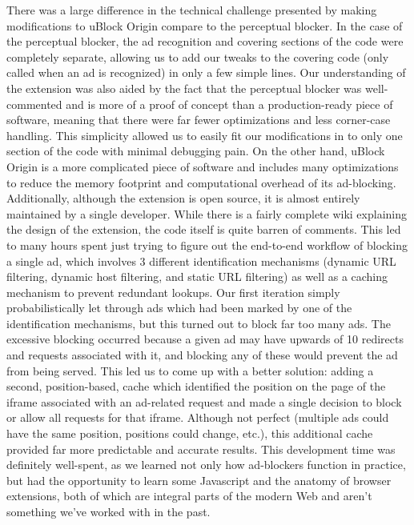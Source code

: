 There was a large difference in the technical challenge presented by making modifications to uBlock Origin compare to the perceptual blocker.
In the case of the perceptual blocker, the ad recognition and covering sections of the code were completely separate, allowing us to add our tweaks to the covering code (only called when an ad is recognized) in only a few simple lines.
Our understanding of the extension was also aided by the fact that the perceptual blocker was well-commented and is more of a proof of concept than a production-ready piece of software, meaning that there were far fewer optimizations and less corner-case handling.
This simplicity allowed us to easily fit our modifications in to only one section of the code with minimal debugging pain.
On the other hand, uBlock Origin is a more complicated piece of software and includes many optimizations to reduce the memory footprint and computational overhead of its ad-blocking.
Additionally, although the extension is open source, it is almost entirely maintained by a single developer.
While there is a fairly complete wiki explaining the design of the extension, the code itself is quite barren of comments.
This led to many hours spent just trying to figure out the end-to-end workflow of blocking a single ad, which involves 3 different identification mechanisms (dynamic URL filtering, dynamic host filtering, and static URL filtering) as well as a caching mechanism to prevent redundant lookups.
Our first iteration simply probabilistically let through ads which had been marked by one of the identification mechanisms, but this turned out to block far too many ads.
The excessive blocking occurred because a given ad may have upwards of 10 redirects and requests associated with it, and blocking any of these would prevent the ad from being served.
This led us to come up with a better solution: adding a second, position-based, cache which identified the position on the page of the iframe associated with an ad-related request and made a single decision to block or allow all requests for that iframe.
Although not perfect (multiple ads could have the same position, positions could change, etc.), this additional cache provided far more predictable and accurate results.
This development time was definitely well-spent, as we learned not only how ad-blockers function in practice, but had the opportunity to learn some Javascript and the anatomy of browser extensions, both of which are integral parts of the modern Web and aren't something we've worked with in the past.

